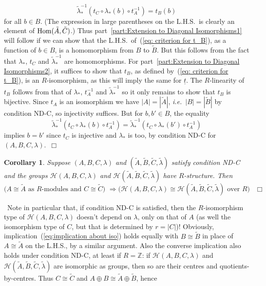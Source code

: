 \documentclass[12pt]{article}
\newtheorem{cor}{Corollary}[section]
\newcommand{\bbZ}{\ensuremath{\mathbb{Z}}}
\newcommand{\cH}{\ensuremath{\mathcal{H}}}
\newcommand{\ePf}{~$\Box$\vertsp\par}%
\newcommand{\Hom}{{\rm Hom}}
\newcommand{\ie}{{\em i.e.}}
\newcommand{\inv}{^{-1}}%
\renewcommand{\rem}{\refstepcounter{rem}\noindent{\sc Remark \therem}}
\renewcommand{\t}[1]{\tilde{#1}}
\renewcommand{\therem}{\thesection.\arabic{rem}}
\newcommand{\vertsp}{\vspace{1ex}}
\newcommand{\Hei}[4]{\cH({#1},{#2},{#3},{#4})}
\newcommand{\HeiStan}{\Hei{A}{B}{C}{\lambda}}
\begin{document}
\begin{equation}\label{eq: criterion for t_B}
{\t \lambda}_\ast\inv\left(t_C\circ\lambda_\ast(b)\circ t_A\inv\right)=
t_B(b)\end{equation}
for all $b\in B$. (The expression in large parentheses on the L.H.S.\ is clearly an element of $\Hom(\t A,\t C)$.) Thus part~\ref{part:Extension to Diagonal Isomorphisms1} will follow if we can show that the L.H.S.\ of~(\ref{eq: criterion for t_B}), as a function of $b\in B$, is a homomorphism from $B$ to $\t B$. But this follows from the fact that $\lambda_\ast$, $t_C$ and ${\t \lambda}_\ast\inv$ are homomorphisms. For part~\ref{part:Extension to Diagonal Isomorphisms2}, it suffices to show that $t_B$, as defined by~(\ref{eq: criterion for t_B}), is an $R$-isomorphism, as this will imply the same for $\underline{t}$. The $R$-linearity of $t_B$ follows from that of 
 $\lambda_\ast$, $t_A\inv$ and ${\t \lambda}_\ast\inv$ so it only remains to show that $t_B$ is bijective. Since $t_A$ is an isomorphism we have $|A|=|\t A|$, \ie\  $|B|=|\t B|$ by condition ND-C, so injectivity suffices. But for $b,b'\in B$, the equality
 $$
 {\t \lambda}_\ast\inv\left(t_C\circ\lambda_\ast(b)\circ t_A\inv\right)=
 {\t \lambda}_\ast\inv\left(t_C\circ\lambda_\ast(b')\circ t_A\inv\right)
 $$
implies $b=b'$ since $t_C$ is injective and $\lambda_\ast$ is too, by condition ND-C for 
$(A,B,C,\lambda)$.\ePf
\begin{cor}\label{cor:implication about iso}
	Suppose $(A,B,C,\lambda)$ and 
	$({\t A},{\t B},{\t C},{\t \lambda})$ satisfy condition ND-C and 
	the groups $\HeiStan$  and $\cH({\t A},{\t B},{\t C},{\t \lambda})$ have $R$-structure. Then
	\begin{equation}\label{eq:implication about iso}
		\mbox{
			($A \cong\t A$ 
			as $R$-modules and $C \cong \t C$) $\Longrightarrow$
			($\HeiStan\cong\cH({\t A},{\t B},{\t C},{\t \lambda})$ over $R$)
		}\ \ \Box\ \ \	\end{equation}
\end{cor}
\rem\  Note in particular that, if condition ND-C is satisfied, then the $R$-isomorphism type of $\HeiStan$ doesn't depend on $\lambda$, only on that of $A$ (as well the isomorphism type of $C$, but that is determined by $r=|C|$)! Obviously, implication~(\ref{eq:implication about iso}) holds equally with $B\cong\t B$ in place of $A\cong\t A$ on the L.H.S., by a similar argument. Also the converse implication also holds under condition ND-C, at least if $R=\bbZ$: if $\HeiStan$ and  $\cH({\t A},{\t B},{\t C},{\t \lambda})$ are isomorphic as groups, then so are their centres and quotients-by-centres. Thus $C\cong\t C$ and $A\oplus B\cong \t A\oplus \t B$, hence   
\end{document}
